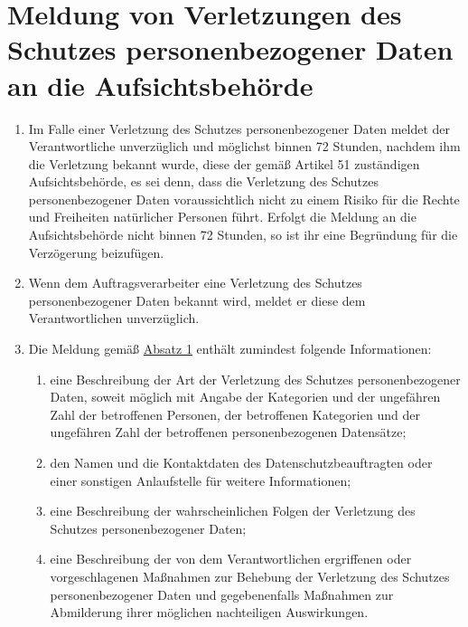 \chapter{Meldung von Verletzungen des Schutzes personenbezogener Daten an die Aufsichtsbehörde}
\label{ch:33}


\begin{enumerate}

  \item Im Falle einer Verletzung des Schutzes personenbezogener Daten meldet der Verantwortliche unverzüglich und
   möglichst binnen 72 Stunden, nachdem ihm die Verletzung bekannt wurde, diese der gemäß Artikel 51 zuständigen
   Aufsichtsbehörde, es sei denn, dass die Verletzung des Schutzes personenbezogener Daten voraussichtlich nicht zu
   einem Risiko für die Rechte und Freiheiten natürlicher Personen führt. Erfolgt die Meldung an die Aufsichtsbehörde
   nicht binnen 72 Stunden, so ist ihr eine Begründung für die Verzögerung beizufügen.
  \label{itm:33-1}

  \item Wenn dem Auftragsverarbeiter eine Verletzung des Schutzes personenbezogener Daten bekannt wird, meldet er diese
   dem Verantwortlichen unverzüglich.
  \label{itm:33-2}

  \item Die Meldung gemäß \hyperref[itm:33-1]{Absatz 1} enthält zumindest folgende Informationen:
  \label{itm:33-3}

  \begin{enumerate}
  
    \item eine Beschreibung der Art der Verletzung des Schutzes personenbezogener Daten, soweit möglich mit Angabe der
     Kategorien und der ungefähren Zahl der betroffenen Personen, der betroffenen Kategorien und der ungefähren Zahl
     der betroffenen personenbezogenen Datensätze;
    \label{itm:33-3a}

    \item den Namen und die Kontaktdaten des Datenschutzbeauftragten oder einer sonstigen Anlaufstelle für weitere
     Informationen;
    \label{itm:33-3b}

    \item eine Beschreibung der wahrscheinlichen Folgen der Verletzung des Schutzes personenbezogener Daten;
    \label{itm:33-3c}

    \item eine Beschreibung der von dem Verantwortlichen ergriffenen oder vorgeschlagenen Maßnahmen zur Behebung der
     Verletzung des Schutzes personenbezogener Daten und gegebenenfalls Maßnahmen zur Abmilderung ihrer möglichen
     nachteiligen Auswirkungen.
    \label{itm:33-3d}


\end{enumerate}
\end{enumerate}
